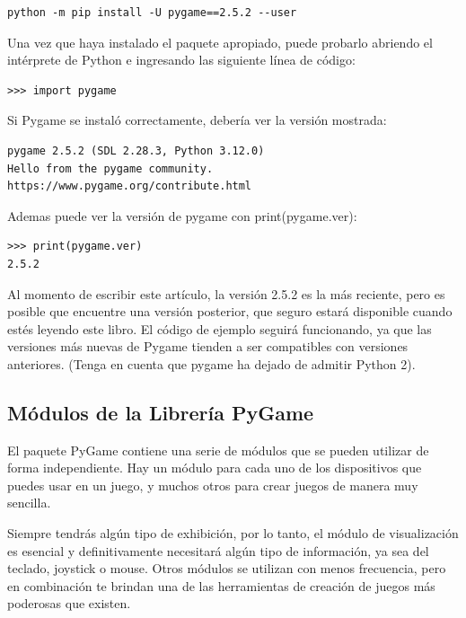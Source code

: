 \begin{lstlisting}
python -m pip install -U pygame==2.5.2 --user	
\end{lstlisting}

Una vez que haya instalado el paquete apropiado, puede probarlo abriendo el intérprete de Python
e ingresando las siguiente  línea de código:

\begin{lstlisting}
>>> import pygame
\end{lstlisting}

Si Pygame se instaló correctamente, debería ver la versión mostrada:
{\ttfamily\scriptsize\scriptsize 
	\hspace{-0.65cm} \vspace{-0.3cm}	
	{\color{blue} 	
\begin{verbatim}
pygame 2.5.2 (SDL 2.28.3, Python 3.12.0)
Hello from the pygame community. https://www.pygame.org/contribute.html
\end{verbatim}
}}
 
Ademas puede ver la versión de pygame con {\ttfamily print(pygame.ver)}:

\begin{lstlisting}
>>> print(pygame.ver)
2.5.2	
\end{lstlisting}

Al momento de escribir este artículo, la versión 2.5.2 es la más reciente, pero es posible que encuentre una versión posterior,
que seguro estará disponible cuando estés  leyendo este libro. El código de ejemplo seguirá funcionando, ya que las versiones más nuevas
de Pygame tienden a ser compatibles con versiones anteriores. (Tenga en cuenta que pygame ha dejado de admitir Python 2).


\subsection{Módulos de la Librería PyGame}   %


El paquete  PyGame contiene una serie de módulos que se pueden utilizar de forma independiente. Hay
un módulo para cada uno de los dispositivos que puedes usar en un juego, y muchos otros para crear juegos
de manera muy sencilla. 

Siempre tendrás algún tipo de exhibición, por lo tanto, el módulo de visualización es esencial y 
definitivamente necesitará algún tipo de información, ya sea del teclado, joystick o mouse. Otros módulos se utilizan con menos frecuencia, pero en combinación te brindan una de las herramientas de creación de juegos más poderosas que existen.

